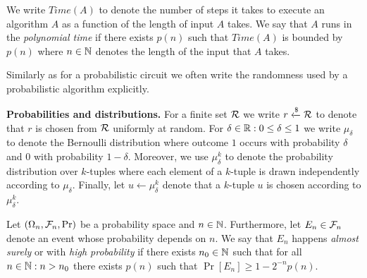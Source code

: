 We write $\mathit{Time}(A)$ to denote the number of steps it takes to execute
an algorithm $A$ as a function of the length of input $A$ takes.
We say that $A$ runs in the \textit{polynomial time} if there exists $p(n)$
such that $\mathit{Time}(A)$ is bounded by $p(n)$ where $n \in \mathbb{N}$ denotes the length of the input that $A$ takes.

Similarly as for a probabilistic circuit we often write the randomness used by a probabilistic algorithm explicitly.


\textbf{Probabilities and distributions.}
For a finite set $\mathcal{R}$ we write $r \xleftarrow{\$} \mathcal{R}$ to denote that $r$ is chosen from $\mathcal{R}$ uniformly at random.
For $\delta \in \mathbb{R} : 0 \leq \delta \leq 1$ we write $\mu_{\delta}$ to denote the Bernoulli distribution where outcome $1$ occurs with
probability $\delta$ and $0$ with probability $1-\delta$.
Moreover, we use $\mu_{\delta}^k$ to denote the probability distribution over $k$-tuples
where each element of a $k$-tuple is drawn independently according to $\mu_{\delta}$.
Finally, let $u \leftarrow \mu_{\delta}^k$ denote that a $k$-tuple $u$ is chosen according to $\mu_{\delta}^k$.


Let $(\Omega_n, \mathcal{F}_n, \Pr)$ be a probability space and $n \in \mathbb{N}$.
Furthermore, let $E_n \in \mathcal{F}_n$ denote an event whose probability depends on $n$.
We say that $E_n$ happens \textit{almost surely} or with \textit{high probability} if
there exists $n_0 \in \mathbb{N}$ such that for all $n \in \mathbb{N} : n > n_0$ there exists $p(n)$ such that $\Pr[E_n] \geq 1 - 2^{-n} \mathit{p}(n)$.

